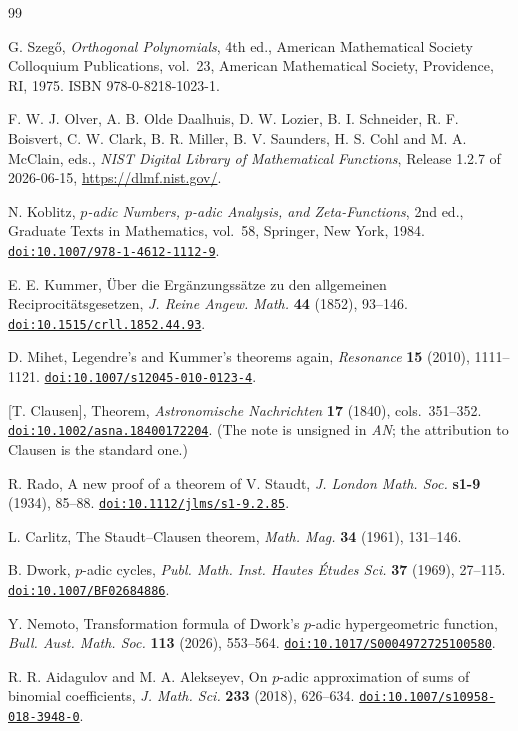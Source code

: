 \documentclass[12pt]{amsart}
\theoremstyle{definition}
\theoremstyle{remark}
\newcommand{\doi}[1]{\href{https://doi.org/#1}{\nolinkurl{doi:#1}}}
\begin{document}
\begin{thebibliography}{99}

G. Szeg\H{o},
\emph{Orthogonal Polynomials}, 4th ed.,
American Mathematical Society Colloquium Publications, vol.~23,
American Mathematical Society, Providence, RI, 1975.
ISBN 978-0-8218-1023-1.

F. W. J. Olver, A. B. Olde Daalhuis, D. W. Lozier,
B. I. Schneider, R. F. Boisvert, C. W. Clark, B. R. Miller,
B. V. Saunders, H. S. Cohl and M. A. McClain, eds.,
\emph{NIST Digital Library of Mathematical Functions},
Release 1.2.7 of 2026-06-15,
\url{https://dlmf.nist.gov/}.

N. Koblitz,
\emph{$p$-adic Numbers, $p$-adic Analysis, and Zeta-Functions},
2nd ed., Graduate Texts in Mathematics, vol.~58,
Springer, New York, 1984.
\doi{10.1007/978-1-4612-1112-9}.

E. E. Kummer,
\"Uber die Erg\"anzungss\"atze zu den allgemeinen Reciprocit\"atsgesetzen,
\emph{J. Reine Angew. Math.} \textbf{44} (1852), 93--146.
\doi{10.1515/crll.1852.44.93}.

D. Mihet,
Legendre's and Kummer's theorems again,
\emph{Resonance} \textbf{15} (2010), 1111--1121.
\doi{10.1007/s12045-010-0123-4}.

[T. Clausen],
Theorem,
\emph{Astronomische Nachrichten} \textbf{17} (1840), cols.~351--352.
\doi{10.1002/asna.18400172204}.
(The note is unsigned in \emph{AN}; the attribution to Clausen is the
standard one.)

R. Rado,
A new proof of a theorem of V. Staudt,
\emph{J. London Math. Soc.} \textbf{s1-9} (1934), 85--88.
\doi{10.1112/jlms/s1-9.2.85}.

L. Carlitz,
The Staudt--Clausen theorem,
\emph{Math. Mag.} \textbf{34} (1961), 131--146.

B. Dwork,
$p$-adic cycles,
\emph{Publ. Math. Inst. Hautes \'Etudes Sci.} \textbf{37} (1969), 27--115.
\doi{10.1007/BF02684886}.

Y. Nemoto,
Transformation formula of Dwork's $p$-adic hypergeometric function,
\emph{Bull. Aust. Math. Soc.} \textbf{113} (2026), 553--564.
\doi{10.1017/S0004972725100580}.

R. R. Aidagulov and M. A. Alekseyev,
On $p$-adic approximation of sums of binomial coefficients,
\emph{J. Math. Sci.} \textbf{233} (2018), 626--634.
\doi{10.1007/s10958-018-3948-0}.


\end{thebibliography}
\end{document}
